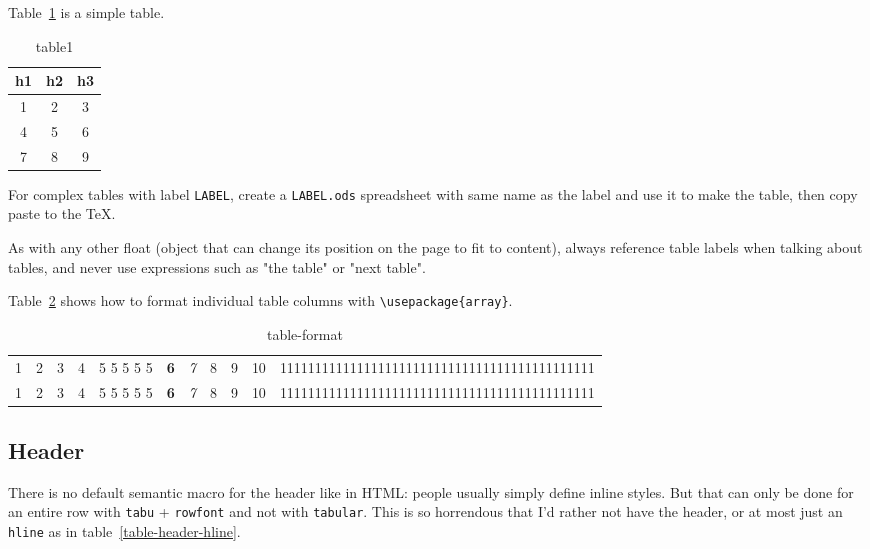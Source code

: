 \documentclass[12pt]{article}
\begin{document}
  Table~\ref{table1} is a simple table.

  \begin{table}[!htpb]
    \begin{tabular}{ccc}
      h1 & h2 & h3 \\
      \hline
      1 & 2 & 3 \\
      4 & 5 & 6 \\
      7 & 8 & 9 \\
    \end{tabular}
    \caption{table1}
    \label{table1}
  \end{table}

  For complex tables with label \lstinline|LABEL|, create a \lstinline|LABEL.ods| spreadsheet with same name as the label and use it to make the table, then copy paste to the TeX.

  As with any other float (object that can change its position on the page to fit to content), always reference table labels when talking about tables, and never use expressions such as "the table" or "next table".

  Table~\ref{table-format} shows how to format individual table columns with \lstinline|\usepackage{array}|.

  \begin{table}[!htpb]
    \begin{tabular}{l c rp{1cm} p{1cm} >{\bf}c >{\it}c | c || c @{abc} c c}
      1 & 2 & 3 & 4 & 5 5 5 5 5 & 6 & 7 & 8 & 9 & 10 & 111111111111111111111111111111111111111111111 \\
      1 & 2 & 3 & 4 & 5 5 5 5 5 & 6 & 7 & 8 & 9 & 10 & 111111111111111111111111111111111111111111111 \\
    \end{tabular}
    \caption{table-format}
    \label{table-format}
  \end{table}

  \subsection{Header}\label{table-header}

    There is no default semantic macro for the header like in HTML: people usually simply define inline styles. But that can only be done for an entire row with \lstinline|tabu| + \lstinline|rowfont| and not with \lstinline|tabular|. This is so horrendous that I'd rather not have the header, or at most just an \lstinline|hline| as in table~\ref{table-header-hline}.
\end{document}
